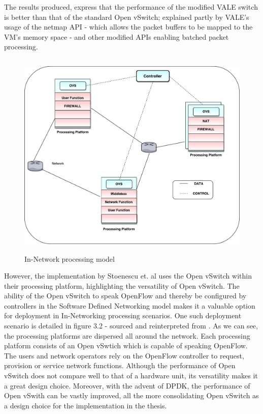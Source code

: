 The results produced, express that the performance of the modified VALE switch is better than that of the standard Open vSwitch; explained partly by VALE's usage of the netmap API - which allows the packet buffers to be mapped to the VM's memory space - and other modified APIs enabling batched packet processing.

 \begin{figure}[H]
 \centering
 \caption{In-Network processing model} 
 \includegraphics[height=10cm]{innet01.pdf} 
\end{figure}

However, the implementation by Stoenescu et. al \cite{NpForMasses} uses the Open vSwitch within their processing platform, highlighting the versatility of Open vSwitch. The ability of the Open vSwitch to speak OpenFlow and thereby be configured by controllers in the Software Defined Networking model makes it a valuable option for deployment in In-Networking processing scenarios. One such deployment scenario is detailed in figure 3.2 - sourced and reinterpreted from \cite{NpForMasses}. As we can see, the processing platforms are dispersed all around the network. Each processing platform consists of an Open vSwtich which is capable of speaking OpenFlow. The users and network operators rely on the OpenFlow controller to request, provision or service network functions. Although the performance of Open vSwitch does not compare well to that of a hardware unit, its versatility makes it a great design choice. Moreover, with the advent of DPDK, the performance of Open vSwith can be vastly improved, all the more consolidating Open vSwitch as a design choice for the implementation in the thesis.

